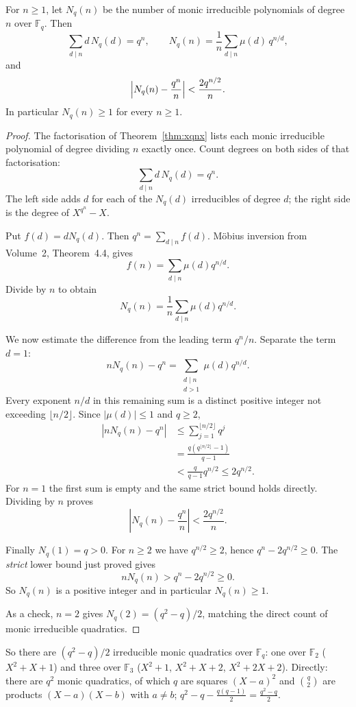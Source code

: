 \begin{theorem}[Gauss]\label{thm:countirr}
For $n\ge1$, let $N_q(n)$ be the number of monic irreducible polynomials of degree $n$ over $\mathbb F_q$. Then
\[
\sum_{d\mid n}d\,N_q(d)=q^n,\qquad N_q(n)=\frac1n\sum_{d\mid n}\mu(d)\,q^{n/d},
\]
and
\[
\Bigl|N_q(n)-\frac{q^n}n\Bigr|<\frac{2q^{n/2}}n.
\]
In particular $N_q(n)\ge1$ for every $n\ge1$.
\end{theorem}
\begin{proof}
The factorisation of Theorem~\ref{thm:xqnx}
lists each monic irreducible polynomial of
degree dividing $n$ exactly once. Count degrees
on both sides of that factorisation:
\[
\boxed{\sum_{d\mid n}d\,N_q(d)=q^n}.
\]
The left side adds $d$ for each of the
$N_q(d)$ irreducibles of degree $d$;
the right side is the degree of $X^{q^n}-X$.

Put $f(d)=dN_q(d)$.
Then $q^n=\sum_{d\mid n}f(d)$.
Möbius inversion from Volume~2, Theorem~4.4, gives
\[
f(n)=\sum_{d\mid n}\mu(d)q^{n/d}.
\]
Divide by $n$ to obtain
\[
\boxed{N_q(n)=\frac1n\sum_{d\mid n}\mu(d)q^{n/d}}.
\]

We now estimate the difference from the
leading term $q^n/n$. Separate the term $d=1$:
\[
nN_q(n)-q^n=
\sum_{\substack{d\mid n\\d>1}}\mu(d)q^{n/d}.
\]
Every exponent $n/d$ in this remaining sum
is a distinct positive integer not exceeding
$\lfloor n/2\rfloor$.
Since $|\mu(d)|\le1$ and $q\ge2$,
\[
\begin{aligned}
|nN_q(n)-q^n|
&\le\sum_{j=1}^{\lfloor n/2\rfloor}q^j\\
&=\frac{q(q^{\lfloor n/2\rfloor}-1)}{q-1}\\
&<\frac{q}{q-1}q^{n/2}
\le2q^{n/2}.
\end{aligned}
\]
For $n=1$ the first sum is empty and
the same strict bound holds directly.
Dividing by $n$ proves
\[
\boxed{\left|N_q(n)-\frac{q^n}{n}\right|
<\frac{2q^{n/2}}{n}}.
\]

Finally $N_q(1)=q>0$. For $n\ge2$
we have $q^{n/2}\ge2$, hence
$q^n-2q^{n/2}\ge0$.
The \emph{strict} lower bound just proved gives
\[
nN_q(n)>q^n-2q^{n/2}\ge0.
\]
So $N_q(n)$ is a positive integer
and in particular $N_q(n)\ge1$.

As a check, $n=2$ gives
$N_q(2)=(q^2-q)/2$, matching the
direct count of monic irreducible quadratics.
\end{proof}

So there are $(q^2-q)/2$ irreducible monic quadratics over $\mathbb F_q$: one over $\mathbb F_2$ ($X^2+X+1$) and three over $\mathbb F_3$ ($X^2+1$, $X^2+X+2$, $X^2+2X+2$). Directly: there are $q^2$ monic quadratics, of which $q$ are squares $(X-a)^2$ and $\binom q2$ are products $(X-a)(X-b)$ with $a\ne b$; $q^2-q-\frac{q(q-1)}2=\frac{q^2-q}2$.

